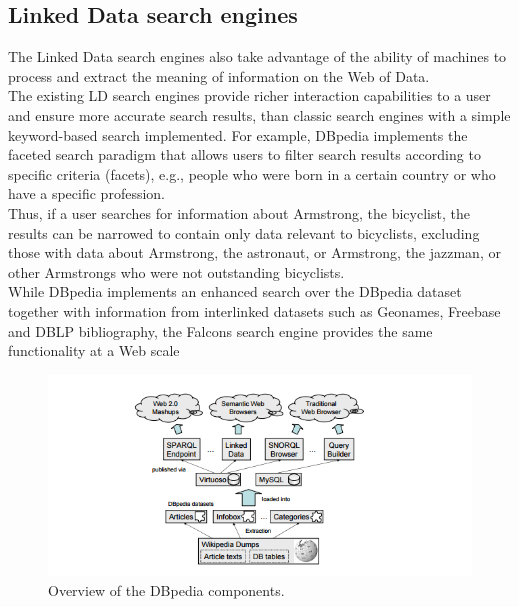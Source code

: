 \documentclass[a4paper,12pt,oneside]{report}
\begin{document}
{{{\subsection{Linked Data search engines}
{The Linked Data search engines also take advantage of the ability of machines to process and extract the meaning of information on the Web of Data. \\
The existing LD search engines provide richer interaction capabilities to a user and ensure more accurate search results, than classic search engines with a simple keyword-based search implemented. For example, DBpedia implements the faceted search paradigm  that allows users to filter search results according to specific criteria (facets), e.g., people who were born in a certain country or who have a specific profession.\\
 Thus, if a user searches for information about Armstrong, the bicyclist, the results can be narrowed to contain only data relevant to bicyclists, excluding those with data about Armstrong, the astronaut, or Armstrong, the jazzman, or other Armstrongs who were not outstanding bicyclists. \\
While DBpedia implements an enhanced search over the DBpedia dataset together with information from interlinked datasets such as Geonames, Freebase and DBLP bibliography, the Falcons search engine provides the same functionality at a Web scale
\begin{figure}[h!]
\centering
\includegraphics[width=1\textwidth]{Capture22}
\caption{Overview of the DBpedia components.}
\end{figure}

}
}}}
\end{document}
